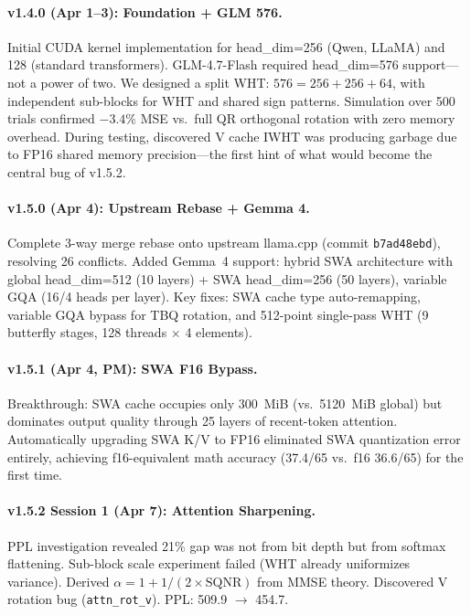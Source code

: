 \documentclass[10pt,twocolumn]{article}
\begin{document}
\paragraph{v1.4.0 (Apr 1--3): Foundation + GLM 576.}
Initial CUDA kernel implementation for head\_dim=256 (Qwen, LLaMA) and 128 (standard transformers). GLM-4.7-Flash required head\_dim=576 support---not a power of two. We designed a split WHT: $576 = 256 + 256 + 64$, with independent sub-blocks for WHT and shared sign patterns. Simulation over 500 trials confirmed $-3.4\%$ MSE vs.\ full QR orthogonal rotation with zero memory overhead. During testing, discovered V cache IWHT was producing garbage due to FP16 shared memory precision---the first hint of what would become the central bug of v1.5.2.

\paragraph{v1.5.0 (Apr 4): Upstream Rebase + Gemma 4.}
Complete 3-way merge rebase onto upstream llama.cpp (commit \texttt{b7ad48ebd}), resolving 26 conflicts. Added Gemma~4 support: hybrid SWA architecture with global head\_dim=512 (10 layers) + SWA head\_dim=256 (50 layers), variable GQA (16/4 heads per layer). Key fixes: SWA cache type auto-remapping, variable GQA bypass for TBQ rotation, and 512-point single-pass WHT (9 butterfly stages, 128 threads $\times$ 4 elements).

\paragraph{v1.5.1 (Apr 4, PM): SWA F16 Bypass.}
Breakthrough: SWA cache occupies only 300~MiB (vs.\ 5120~MiB global) but dominates output quality through 25 layers of recent-token attention. Automatically upgrading SWA K/V to FP16 eliminated SWA quantization error entirely, achieving f16-equivalent math accuracy (37.4/65 vs.\ f16 36.6/65) for the first time.

\paragraph{v1.5.2 Session 1 (Apr 7): Attention Sharpening.}
PPL investigation revealed 21\% gap was not from bit depth but from softmax flattening. Sub-block scale experiment failed (WHT already uniformizes variance). Derived $\alpha = 1 + 1/(2 \times \text{SQNR})$ from MMSE theory. Discovered V rotation bug (\texttt{attn\_rot\_v}). PPL: 509.9 $\to$ 454.7.
\end{document}
